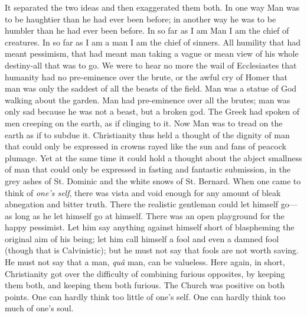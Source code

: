 \documentclass{book}
\begin{document}
It separated the two ideas and then exaggerated them both. In one way Man was to be haughtier than he had ever been before; in another way he was to be humbler than he had ever been before. In so far as I am Man I am the chief of creatures. In so far as I am a man I am the chief of sinners. All humility that had meant pessimism, that had meant man taking a vague or mean view of his whole destiny-all that was to go. We were to hear no more the wail of Ecclesiastes that humanity had no pre-eminence over the brute, or the awful cry of Homer that man was only the saddest of all the beasts of the field. Man was a statue of God walking about the garden. Man had pre-eminence over all the brutes; man was only sad because he was not a beast, but a broken god. The Greek had spoken of men creeping on the earth, as if clinging to it. Now Man was to tread on the earth as if to subdue it. Christianity thus held a thought of the dignity of man that could only be expressed in crowns rayed like the sun and fans of peacock plumage. Yet at the same time it could hold a thought about the abject smallness of man that could only be expressed in fasting and fantastic submission, in the grey ashes of St. Dominic and the white snows of St. Bernard. When one came to think of \emph{one’s self}, there was vista and void enough for any amount of bleak abnegation and bitter truth. There the realistic gentleman could let himself go—as long as he let himself go at himself. There was an open playground for the happy pessimist. Let him say anything against himself short of blaspheming the original aim of his being; let him call himself a fool and even a damned fool (though that is Calvinistic); but he must not say that fools are not worth saving. He must not say that a man, \emph{quâ} man, can be valueless. Here again, in short, Christianity got over the difficulty of combining furious opposites, by keeping them both, and keeping them both furious. The Church was positive on both points. One can hardly think too little of one’s self. One can hardly think too much of one’s soul.
\end{document}
